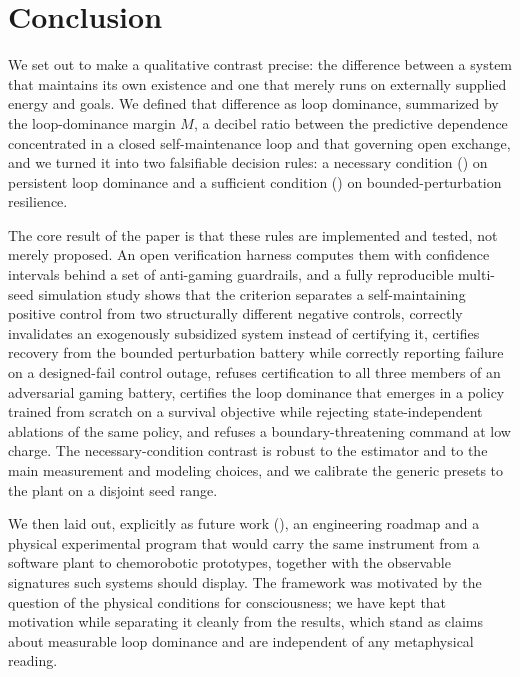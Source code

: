\documentclass[11pt]{article}
\begin{document}
\section{Conclusion}
\label{sec:conclusion}

We set out to make a qualitative contrast precise: the difference between a system that maintains its own existence and one that merely runs on externally supplied energy and goals. We defined that difference as loop dominance, summarized by the loop-dominance margin $M$, a decibel ratio between the predictive dependence concentrated in a closed self-maintenance loop and that governing open exchange, and we turned it into two falsifiable decision rules: a necessary condition (\NC) on persistent loop dominance and a sufficient condition (\SC) on bounded-perturbation resilience.

The core result of the paper is that these rules are implemented and tested, not merely proposed. An open verification harness computes them with confidence intervals behind a set of anti-gaming guardrails, and a fully reproducible multi-seed simulation study shows that the criterion separates a self-maintaining positive control from two structurally different negative controls, correctly invalidates an exogenously subsidized system instead of certifying it, certifies recovery from the bounded perturbation battery while correctly reporting failure on a designed-fail control outage, refuses certification to all three members of an adversarial gaming battery, certifies the loop dominance that emerges in a policy trained from scratch on a survival objective while rejecting state-independent ablations of the same policy, and refuses a boundary-threatening command at low charge. The necessary-condition contrast is robust to the estimator and to the main measurement and modeling choices, and we calibrate the generic presets to the plant on a disjoint seed range.

We then laid out, explicitly as future work (), an engineering roadmap and a physical experimental program that would carry the same instrument from a software plant to chemorobotic prototypes, together with the observable signatures such systems should display. The framework was motivated by the question of the physical conditions for consciousness; we have kept that motivation while separating it cleanly from the results, which stand as claims about measurable loop dominance and are independent of any metaphysical reading.
\end{document}
